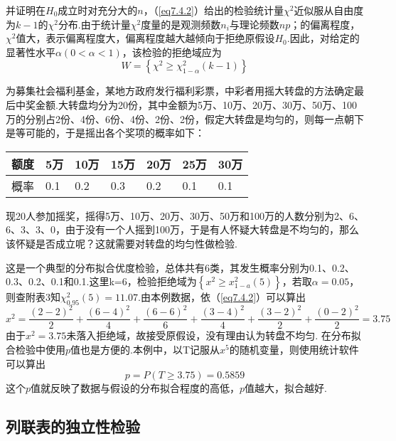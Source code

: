 并证明在$H_{0}$成立时对充分大的$n$，（\ref{eq7.4.2}）给出的检验统计量$\chi^{2}$近似服从自由度为$k-1$的$\chi^{2}$分布.由于统计量$\chi^{2}$度量的是观测频数$n_{i}$与理论频数$np$；的偏离程度，$\chi^{2}$值大，表示偏离程度大，偏离程度越大越倾向于拒绝原假设$H_{0}$.因此，对给定的显著性水平$\alpha(0<\alpha<1)$，该检验的拒绝域应为
\begin{equation}\label{eq7.4.3}
W=\left\{\chi^2\geq\chi_{1-\alpha}^{2}\left(k-1\right)\right\}
\end{equation}
\begin{example}\label{exam7.4.1}
	为募集社会福利基金，某地方政府发行福利彩票，中彩者用摇大转盘的方法确定最后中奖金额.大转盘均分为20份，其中金额为5万、10万、20万、30万、50万、100万的分别占2份、4份、6份、4份、2份、2份，假定大转盘是均匀的，则每一点朝下是等可能的，于是摇出各个奖项的概率如下：
	
	\begin{table}[!htp]
		\centering
		\begin{tabularx}{1.0\textwidth}{Z|ZZZZZZ}
			额度&5万&10万&15万&20万&25万&30万\\
			\midrule
			概率&0.1&0.2&0.3&0.2&0.1&0.1
		\end{tabularx}
	\end{table}
	现20人参加摇奖，摇得5万、10万、20万、30万、50万和100万的人数分别为2、6、6、3、3、0，由于没有一个人摇到100万，于是有人怀疑大转盘是不均匀的，那么该怀疑是否成立呢？这就需要对转盘的均匀性做检验.
\end{example}
\begin{solution}
这是一个典型的分布拟合优度检验，总体共有6类，其发生概率分别为0.1、0.2、0.3、0.2、0.1和0.1.这里k=6，检验拒绝域为$\left\{ x ^ { 2 } \geq x _ { 1 - a } ^ { 2 } ( 5 ) \right\}$，若取$\alpha=0.05$，则查附表3知$\chi _ { 0.95 } ^ { 2 } ( 5 ) = 11.07$.由本例数据，依（\ref{eq7.4.2}）可以算出
\[x ^ { 2 } = \frac { ( 2 - 2 ) ^ { 2 } } { 2 } + \frac { ( 6 - 4 ) ^ { 2 } } { 4 } + \frac { ( 6 - 6 ) ^ { 2 } } { 6 } + \frac { ( 3 - 4 ) ^ { 2 } } { 4 } +\frac { ( 3 - 2 ) ^ { 2 } } { 2 } + \frac { ( 0 - 2 ) ^ { 2 } } { 2 } = 3.75\]
由于$x ^ { 2 } = 3.75$未落入拒绝域，故接受原假设，没有理由认为转盘不均匀.
在分布拟合检验中使用$p$值也是方便的.本例中，以T记服从$x ^ {5}$的随机变量，则使用统计软件可以算出
\[p = P ( T \geq 3.75 ) = 0.5859\]
这个$p$值就反映了数据与假设的分布拟合程度的高低，$p$值越大，拟合越好.
\end{solution}
\subsection{列联表的独立性检验}\label{sec:7.3.2}

